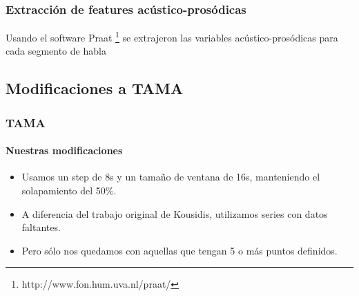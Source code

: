 \begin{frame}
\frametitle{Extracción de features acústico-prosódicas}

Usando el software Praat \footnote{http://www.fon.hum.uva.nl/praat/} se extrajeron las variables acústico-prosódicas para cada segmento de habla

\begin{table}
\end{table}
\end{frame}



\subsection{Modificaciones a TAMA}

\begin{frame}
\frametitle{TAMA}
\framesubtitle{Nuestras modificaciones}

\begin{itemize}
  \item Usamos un step de 8s y un tamaño de ventana de 16s, manteniendo el solapamiento del 50\%.
  \item A diferencia del trabajo original de Kousidis, utilizamos series con datos faltantes.
  \item Pero sólo nos quedamos con aquellas que tengan 5 o más puntos definidos.
\end{itemize}
\end{frame}


